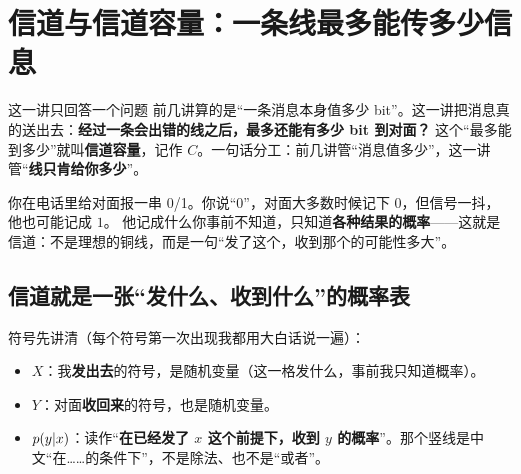 \section{信道与信道容量：一条线最多能传多少信息}

\begin{idea}{这一讲只回答一个问题}
前几讲算的是“一条消息本身值多少 bit”。这一讲把消息真的送出去：\textbf{经过一条会出错的线之后，最多还能有多少 bit 到对面？}
这个“最多能到多少”就叫\textbf{信道容量}，记作 $C$。一句话分工：前几讲管“消息值多少”，这一讲管“\textbf{线只肯给你多少}”。
\end{idea}

你在电话里给对面报一串 0/1。你说“0”，对面大多数时候记下 $0$，但信号一抖，他也可能记成 $1$。
他记成什么你事前不知道，只知道\textbf{各种结果的概率}——这就是信道：不是理想的铜线，而是一句“发了这个，收到那个的可能性多大”。

\subsection{信道就是一张“发什么、收到什么”的概率表}

符号先讲清（每个符号第一次出现我都用大白话说一遍）：
\begin{itemize}[leftmargin=1.6em,itemsep=1pt]
  \item $X$：我\textbf{发出去}的符号，是随机变量（这一格发什么，事前我只知道概率）。
  \item $Y$：对面\textbf{收回来}的符号，也是随机变量。
  \item $p\!\left(y|x\right)$：读作“\textbf{在已经发了 $x$ 这个前提下，收到 $y$ 的概率}”。那个竖线是中文“在……的条件下”，不是除法、也不是“或者”。
\end{itemize}

